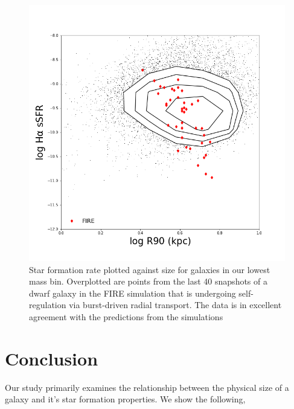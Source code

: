 \documentclass[iop]{emulateapj}
\begin{document}
\begin{figure}
	\centering
	\includegraphics[width=1.5 \columnwidth]{111_dwarf_8_5_size_SF_r.png}
	\caption{Star formation rate plotted against size for galaxies in our lowest mass bin. Overplotted are points from the last 40 snapshots of a dwarf galaxy in the FIRE simulation that is undergoing self-regulation via burst-driven radial transport. The data is in excellent agreement with the predictions from the simulations}
	\label{fig:predict}
	
\end{figure}

\section{Conclusion}

Our study primarily examines the relationship between the physical size of a galaxy and it's star formation properties. We show the following,
\end{document}
